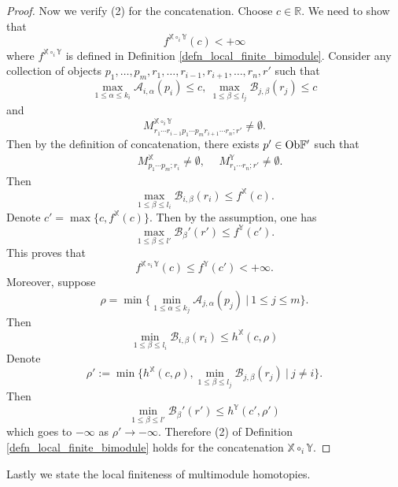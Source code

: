 \documentclass[reqno, 10pt]{amsart}
\numberwithin{equation}{section}
\numberwithin{equation}{section}
\theoremstyle{definition}
\theoremstyle{remark}
\newcommand{\beqn}{\begin{equation*}}
\newcommand{\eeqn}{\end{equation*}}
\newcommand{\mb}{\mathbb}
\newcommand{\mc}{\mathcal}
\begin{document}
\begin{proof}
Now we verify (2) for the concatenation. 
Choose $c \in {\mb R}$. We need to show that 
\beqn
f^{{\mb X} \circ_i {\mb Y}}(c) < +\infty
\eeqn
where $f^{{\mb X} \circ_i {\mb Y}}$ is defined in Definition \ref{defn_local_finite_bimodule}. Consider any collection of objects $p_1, \ldots, p_m, r_1, \ldots, r_{i-1}, r_{i+1}, \ldots, r_n, r'$ such that
\beqn
\max_{1 \leq \alpha \leq k_i} {\mc A}_{i, \alpha}(p_i) \leq c,\ \max_{1 \leq \beta \leq l_j} {\mc B}_{j, \beta}(r_j) \leq  c
\eeqn
and 
\beqn
M_{r_1 \cdots r_{i-1} p_1 \cdots p_m r_{i+1} \cdots r_n; r'}^{{\mb X} \circ_i {\mb Y}} \neq \emptyset.
\eeqn
Then by the definition of concatenation, there exists $p' \in {\rm Ob}{\mb F}'$ such that 
\begin{align*}
&\ M_{p_1 \cdots p_m; r_i}^{{\mb X}} \neq \emptyset,\ &\ M_{r_1 \cdots r_n; r'}^{{\mb Y}} \neq \emptyset.
\end{align*}
Then 
\beqn
\max_{1 \leq \beta \leq l_i} {\mc B}_{i, \beta}(r_i) \leq f^{\mb X}(c).
\eeqn
Denote $c' = \max \{ c, f^{\mb X}(c)\}$. Then by the assumption, one has 
\beqn
\max_{1 \leq \beta \leq l'} {\mc B}_\beta'(r') \leq f^{\mb Y}(c').
\eeqn
This proves that 
\beqn
f^{{\mb X} \circ_i {\mb Y}}(c) \leq f^{{\mb Y}}(c') < +\infty.
\eeqn
Moreover, suppose 
\beqn
\rho  = \min \Big\{ \min_{1 \leq \alpha \leq k_j} {\mc A}_{j, \alpha}(p_j)\ |\ 1 \leq j \leq m \Big\}.
\eeqn
Then 
\beqn
\min_{1 \leq \beta \leq l_i} {\mc B}_{i, \beta} (r_i) \leq h^{{\mb X}}(c, \rho)
\eeqn
Denote
\beqn
\rho':= \min \Big\{ h^{{\mb X}}(c, \rho), \min_{1 \leq \beta \leq l_j} {\mc B}_{j, \beta}(r_j)\ |\ j \neq i \Big\}.
\eeqn
Then 
\beqn
\min_{1 \leq \beta \leq l'} {\mc B}_\beta'(r') \leq h^{\mb Y}(c', \rho')
\eeqn
which goes to $-\infty$ as $\rho' \to -\infty$. Therefore (2) of Definition \ref{defn_local_finite_bimodule} holds for the concatenation ${\mb X} \circ_i {\mb Y}$.
\end{proof}


Lastly we state the local finiteness of multimodule homotopies. 
\end{document}
